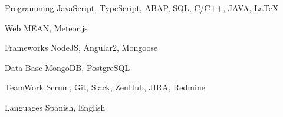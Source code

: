 


\begin{cvskills}


\cvskill
{Programming} %
{JavaScript, TypeScript, ABAP, SQL, C/C++, JAVA, \LaTeX{}} %


\cvskill
{Web} %
{MEAN,  Meteor.js} %

\cvskill
{Frameworks} %
{NodeJS, Angular2, Mongoose} %

\cvskill
{Data Base} %
{MongoDB, PostgreSQL} %

\cvskill
{TeamWork} %
{Scrum, Git, Slack, ZenHub, JIRA, Redmine} %

\cvskill
{Languages} %
{Spanish, English} %


\end{cvskills}

